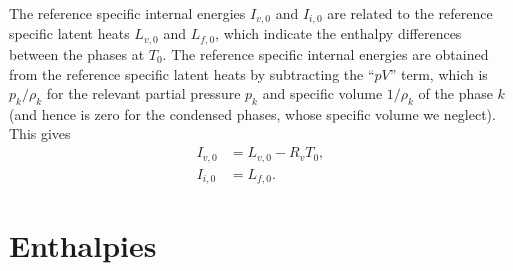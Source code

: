 \documentclass{report}
\begin{document}
The reference specific internal energies $I_{v,0}$ and $I_{i,0}$ are related to the reference specific latent heats $L_{v,0}$ and $L_{f,0}$, which indicate the enthalpy differences between the phases at $T_0$. The reference specific internal energies are obtained from the reference specific latent heats by subtracting the ``$pV$'' term, which is $p_k/\rho_k$ for the relevant partial pressure $p_k$ and specific volume $1/\rho_k$ of the phase $k$ (and hence is zero for the condensed phases, whose specific volume we neglect). This gives
\begin{subequations}\label{e:ref_internal_energies}
\begin{align}
     I_{v,0} &= L_{v, 0} - R_v T_0,\\
     I_{i,0} &= L_{f, 0}.
\end{align}
\end{subequations}
   
\section{Enthalpies}\label{s:enthalpies}
\end{document}
